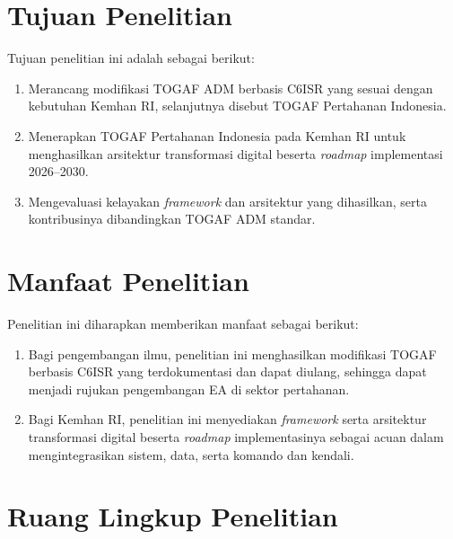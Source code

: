 \section{Tujuan Penelitian}
\label{sec:I.3}

Tujuan penelitian ini adalah sebagai berikut:
\begin{enumerate}[label=\arabic*.]
\item Merancang modifikasi TOGAF ADM berbasis C6ISR yang sesuai dengan kebutuhan Kemhan RI, selanjutnya disebut TOGAF Pertahanan Indonesia.
\item Menerapkan TOGAF Pertahanan Indonesia pada Kemhan RI untuk menghasilkan arsitektur transformasi digital beserta \textit{roadmap} implementasi 2026–2030.
\item Mengevaluasi kelayakan \textit{framework} dan arsitektur yang dihasilkan, serta kontribusinya dibandingkan TOGAF ADM standar.
\end{enumerate}

\section{Manfaat Penelitian}
\label{sec:I.4}

Penelitian ini diharapkan memberikan manfaat sebagai berikut:
\begin{enumerate}[label=\arabic*.]
\item Bagi pengembangan ilmu, penelitian ini menghasilkan modifikasi TOGAF berbasis C6ISR yang terdokumentasi dan dapat diulang, sehingga dapat menjadi rujukan pengembangan EA di sektor pertahanan.
\item Bagi Kemhan RI, penelitian ini menyediakan \textit{framework} serta arsitektur transformasi digital beserta \textit{roadmap} implementasinya sebagai acuan dalam mengintegrasikan sistem, data, serta komando dan kendali.
\end{enumerate}

\section{Ruang Lingkup Penelitian}
\label{sec:I.5}

